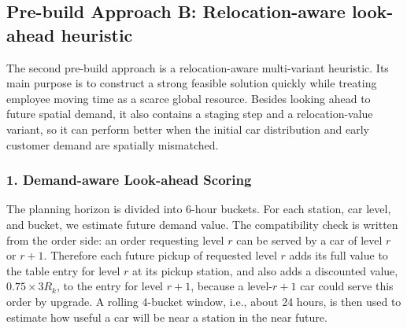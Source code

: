 \documentclass[10pt,a4paper]{article}
\begin{document}
\subsection*{Pre-build Approach B: Relocation-aware look-ahead heuristic}

The second pre-build approach is a relocation-aware multi-variant heuristic.  Its
main purpose is to construct a strong feasible solution quickly while treating
employee moving time as a scarce global resource.  Besides looking ahead to
future spatial demand, it also contains a staging step and a relocation-value
variant, so it can perform better when the initial car distribution and early
customer demand are spatially mismatched.

\subsubsection*{1. Demand-aware Look-ahead Scoring}

The planning horizon is divided into 6-hour buckets.  For each station, car level, and bucket, we estimate future demand value.  The compatibility check is
written from the order side: an order requesting level $r$ can be served by a car of level $r$ or $r+1$.  Therefore each future pickup of requested
level $r$ adds its full value to the table entry for level $r$ at its pickup
station, and also adds a discounted value, $0.75\times 3R_k$, to the entry for level $r+1$, because
a level-$r+1$ car could serve this order by upgrade.  A rolling 4-bucket
window, i.e., about 24 hours, is then used to estimate how useful a car will be
near a station in the near future.
\end{document}
